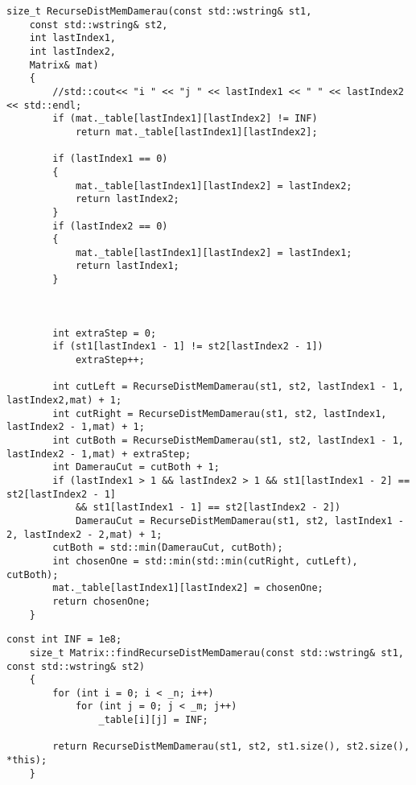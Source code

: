 \begin{lstlisting}[label=lst:damer_rec_mem,caption=Функция нахождения расстояния Дамерау---Левенштейна с использованием рекурсии c мемоизацией]
    size_t RecurseDistMemDamerau(const std::wstring& st1,
	const std::wstring& st2,
	int lastIndex1,
	int lastIndex2,
	Matrix& mat)
    {
        //std::cout<< "i " << "j " << lastIndex1 << " " << lastIndex2 << std::endl;
        if (mat._table[lastIndex1][lastIndex2] != INF)
            return mat._table[lastIndex1][lastIndex2];

        if (lastIndex1 == 0)
        {
            mat._table[lastIndex1][lastIndex2] = lastIndex2;
            return lastIndex2;
        }
        if (lastIndex2 == 0)
        {
            mat._table[lastIndex1][lastIndex2] = lastIndex1;
            return lastIndex1;
        }



        int extraStep = 0;
        if (st1[lastIndex1 - 1] != st2[lastIndex2 - 1])
            extraStep++;

        int cutLeft = RecurseDistMemDamerau(st1, st2, lastIndex1 - 1, lastIndex2,mat) + 1;
        int cutRight = RecurseDistMemDamerau(st1, st2, lastIndex1, lastIndex2 - 1,mat) + 1;
        int cutBoth = RecurseDistMemDamerau(st1, st2, lastIndex1 - 1, lastIndex2 - 1,mat) + extraStep;
        int DamerauCut = cutBoth + 1;
        if (lastIndex1 > 1 && lastIndex2 > 1 && st1[lastIndex1 - 2] == st2[lastIndex2 - 1]
            && st1[lastIndex1 - 1] == st2[lastIndex2 - 2])
            DamerauCut = RecurseDistMemDamerau(st1, st2, lastIndex1 - 2, lastIndex2 - 2,mat) + 1;
        cutBoth = std::min(DamerauCut, cutBoth);
        int chosenOne = std::min(std::min(cutRight, cutLeft), cutBoth);
        mat._table[lastIndex1][lastIndex2] = chosenOne;
        return chosenOne;
    }
\end{lstlisting}

\begin{lstlisting}[label=lst:damer_rec_mem_meth, caption=Метод нахождения расстояния Дамерау---Левенштейна с использованием функции \ref{lst:damer_rec_mem}]
    const int INF = 1e8;
    size_t Matrix::findRecurseDistMemDamerau(const std::wstring& st1, const std::wstring& st2)
    {
        for (int i = 0; i < _n; i++)
            for (int j = 0; j < _m; j++)
                _table[i][j] = INF;
        
        return RecurseDistMemDamerau(st1, st2, st1.size(), st2.size(), *this);
    }
\end{lstlisting}

